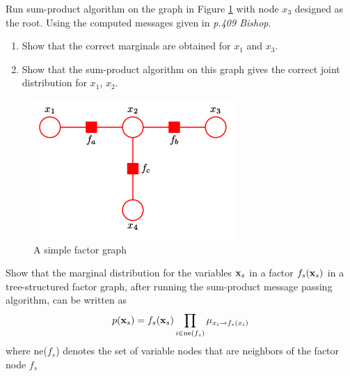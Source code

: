 \documentclass{amsmlaj}
\begin{document}
\newpage

\begin{problem}
Run sum-product algorithm on the graph in Figure \ref{fig:simplegraph} with node
$x_3$ designed as the root. Using the computed messages given in \emph{p.409 Bishop}.
\begin{enumerate}
\item  Show that the correct marginals are obtained for $x_1$ and $x_3$.
\item Show that the sum-product algorithm on this graph gives the correct joint distribution for $x_1$, $x_2$.
\end{enumerate}

\begin{figure}[H]
\begin{center}
\includegraphics[width=.4\textwidth]{simplegraph.png}
\caption{A simple factor graph}
\label{fig:simplegraph}
\end{center}
\end{figure}

\end{problem}

\begin{problem}
Show that the marginal distribution for the variables $\bm{\mathbf{x}}_s$ in a factor
$f_s(\bm{\mathbf{x}}_s)$ in a tree-structured factor graph, after running the sum-product
message passing algorithm, can be written as
\[
p(\bm{\mathbf{x}}_s) = f_s(\bm{\mathbf{x}}_s) \prod\limits_{i \in \text{ne}(f_s)} \mu_{x_i \to f_s(x_i)}
\]
where ne($f_s$) denotes the set of variable nodes that are neighbors of the factor node $f_s$
\end{problem}
\end{document}
